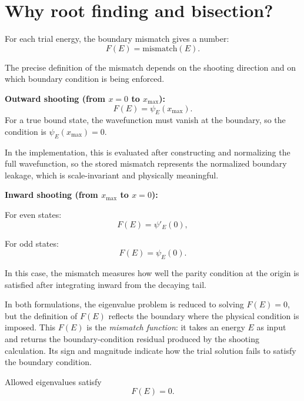\documentclass[11pt]{article}
\begin{document}
    \section{Why root finding and bisection?}

    For each trial energy, the boundary mismatch gives a number:
    \begin{equation}
        F(E)=\text{mismatch}(E).
    \end{equation}

    The precise definition of the mismatch depends on the shooting direction and on which boundary condition is being enforced.

    \textbf{Outward shooting (from $x=0$ to $x_{\max}$):}
    \begin{equation}
        F(E)=\psi_E(x_{\max}).
    \end{equation}
    For a true bound state, the wavefunction must vanish at the boundary, so the condition is $\psi_E(x_{\max})=0$.

    In the implementation, this is evaluated after constructing and normalizing the full wavefunction, so the stored mismatch represents the normalized boundary leakage, which is scale-invariant and physically meaningful.

    \textbf{Inward shooting (from $x_{\max}$ to $x=0$):}

    For even states:
    \begin{equation}
        F(E)=\psi'_E(0),
    \end{equation}

    For odd states:
    \begin{equation}
        F(E)=\psi_E(0).
    \end{equation}

    In this case, the mismatch measures how well the parity condition at the origin is satisfied after integrating inward from the decaying tail.

    In both formulations, the eigenvalue problem is reduced to solving $F(E)=0$, but the definition of $F(E)$ reflects the boundary where the physical condition is imposed.
    This $F(E)$ is the \emph{mismatch function}: it takes an energy $E$ as input and returns the boundary-condition residual produced by the shooting calculation. Its sign and magnitude indicate how the trial solution fails to satisfy the boundary condition.

    Allowed eigenvalues satisfy
    \begin{equation}
        F(E)=0.
    \end{equation}
\end{document}
